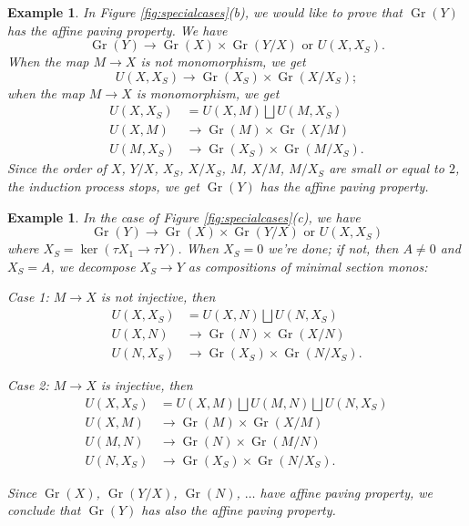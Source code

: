 \documentclass[reqno,11pt]{amsart}
\numberwithin{equation}{section}
\theoremstyle{plain}
\newtheorem{eg}[theorem]{Example}
\theoremstyle{plain}
\numberwithin{equation}{section}
\theoremstyle{remark}
\newcommand{\Gr}{\operatorname{Gr}}
\begin{document}
\begin{eg}
In Figure \ref{fig:specialcases}(b), we would like to prove that  $\Gr(Y)$ has the affine paving property. We have
$$\Gr(Y) \longrightarrow \Gr(X) \times \Gr(Y/X) \text{ or } U(X,X_S).$$
When the map $M \longrightarrow X$ is not monomorphism, we get
$$U(X,X_S) \longrightarrow \Gr(X_S) \times \Gr(X/X_S);$$
when the map $M \longrightarrow X$ is monomorphism, we get
\begin{equation*}
\begin{aligned}
U(X,X_S)&=U(X,M) \bigsqcup U(M,X_S)\\
U(X,M) &\longrightarrow \Gr(M) \times \Gr(X/M)\\
U(M,X_S) &\longrightarrow \Gr(X_S) \times \Gr(M/X_S).
\end{aligned}
\end{equation*}
Since the order of $X$, $Y/X$, $X_S$, $X/X_S$, $M$, $X/M$, $M/X_S$ are small or equal to $2$, the induction process stops, we get $\Gr(Y)$ has the affine paving property.
\end{eg}
\begin{eg}
In the case of Figure \ref{fig:specialcases}(c), we have 
$$\Gr(Y) \longrightarrow \Gr(X) \times \Gr(Y/X) \text{ or } U(X,X_S)$$
where $X_S=\ker(\tau X_1 \longrightarrow \tau Y)$. When $X_S=0$ we're done; if not, then $A \neq 0$ and $X_S=A$, we decompose $X_S \longrightarrow Y$ as compositions of minimal section monos:

Case 1: $M\longrightarrow X$ is not injective, then
 \begin{equation*}
 \begin{aligned}
 U(X,X_S)&=U(X,N) \bigsqcup U(N,X_S)\\
 U(X,N) &\longrightarrow \Gr(N) \times \Gr(X/N)\\
 U(N,X_S) &\longrightarrow \Gr(X_S) \times \Gr(N/X_S).
 \end{aligned}
 \end{equation*}
 
 Case 2: $M\longrightarrow X$ is injective, then
  \begin{equation*}
  \begin{aligned}
  U(X,X_S)&=U(X,M) \bigsqcup U(M,N) \bigsqcup U(N,X_S)\\
  U(X,M) &\longrightarrow \Gr(M) \times \Gr(X/M)\\
  U(M,N) &\longrightarrow \Gr(N) \times \Gr(M/N)\\
  U(N,X_S) &\longrightarrow \Gr(X_S) \times \Gr(N/X_S).
  \end{aligned}
  \end{equation*}
  
  Since $\Gr(X)$, $\Gr(Y/X)$, $\Gr(N)$, $\ldots$ have affine paving property, we conclude that $\Gr(Y)$ has also the affine paving property.
\end{eg}
\end{document}
